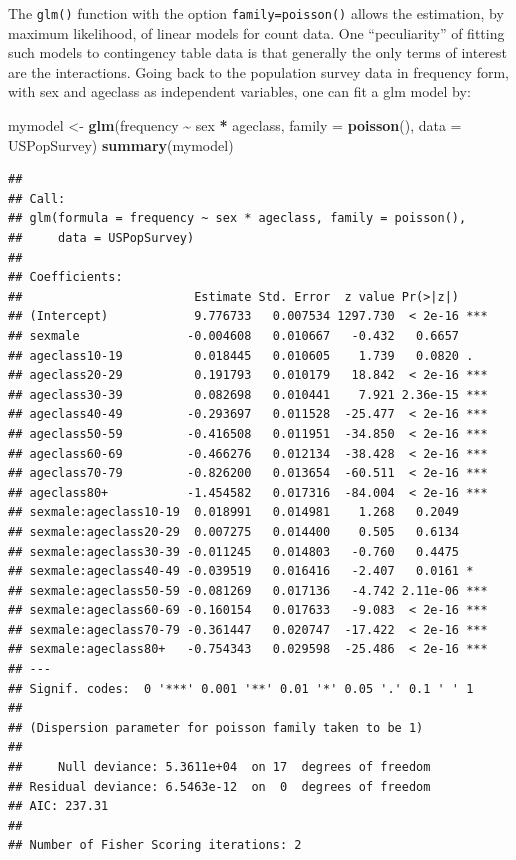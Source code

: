\documentclass[
  12pt,
]{book}
\newenvironment{Shaded}{\begin{snugshade}}{\end{snugshade}}
\newcommand{\DataTypeTok}[1]{\textcolor[rgb]{0.13,0.29,0.53}{#1}}
\newcommand{\KeywordTok}[1]{\textcolor[rgb]{0.13,0.29,0.53}{\textbf{#1}}}
\newcommand{\NormalTok}[1]{#1}
\newcommand{\OperatorTok}[1]{\textcolor[rgb]{0.81,0.36,0.00}{\textbf{#1}}}
\newcommand{\StringTok}[1]{\textcolor[rgb]{0.31,0.60,0.02}{#1}}
\begin{document}
The \texttt{glm()} function with the option \texttt{family=poisson()} allows the estimation, by maximum likelihood, of linear models for count data. One ``peculiarity'' of fitting such models to contingency table data is that generally the only terms of interest are the interactions. Going back to the population survey data in frequency form, with sex and ageclass as independent variables, one can fit a glm model by:

\begin{Shaded}
\begin{Highlighting}[]
\NormalTok{mymodel \textless{}{-}}\StringTok{ }\KeywordTok{glm}\NormalTok{(frequency }\OperatorTok{\textasciitilde{}}\StringTok{ }\NormalTok{sex }\OperatorTok{*}\StringTok{ }\NormalTok{ageclass, }\DataTypeTok{family =} \KeywordTok{poisson}\NormalTok{(), }\DataTypeTok{data =}\NormalTok{ USPopSurvey)}
\KeywordTok{summary}\NormalTok{(mymodel)}
\end{Highlighting}
\end{Shaded}

\begin{verbatim}
## 
## Call:
## glm(formula = frequency ~ sex * ageclass, family = poisson(), 
##     data = USPopSurvey)
## 
## Coefficients:
##                        Estimate Std. Error  z value Pr(>|z|)    
## (Intercept)            9.776733   0.007534 1297.730  < 2e-16 ***
## sexmale               -0.004608   0.010667   -0.432   0.6657    
## ageclass10-19          0.018445   0.010605    1.739   0.0820 .  
## ageclass20-29          0.191793   0.010179   18.842  < 2e-16 ***
## ageclass30-39          0.082698   0.010441    7.921 2.36e-15 ***
## ageclass40-49         -0.293697   0.011528  -25.477  < 2e-16 ***
## ageclass50-59         -0.416508   0.011951  -34.850  < 2e-16 ***
## ageclass60-69         -0.466276   0.012134  -38.428  < 2e-16 ***
## ageclass70-79         -0.826200   0.013654  -60.511  < 2e-16 ***
## ageclass80+           -1.454582   0.017316  -84.004  < 2e-16 ***
## sexmale:ageclass10-19  0.018991   0.014981    1.268   0.2049    
## sexmale:ageclass20-29  0.007275   0.014400    0.505   0.6134    
## sexmale:ageclass30-39 -0.011245   0.014803   -0.760   0.4475    
## sexmale:ageclass40-49 -0.039519   0.016416   -2.407   0.0161 *  
## sexmale:ageclass50-59 -0.081269   0.017136   -4.742 2.11e-06 ***
## sexmale:ageclass60-69 -0.160154   0.017633   -9.083  < 2e-16 ***
## sexmale:ageclass70-79 -0.361447   0.020747  -17.422  < 2e-16 ***
## sexmale:ageclass80+   -0.754343   0.029598  -25.486  < 2e-16 ***
## ---
## Signif. codes:  0 '***' 0.001 '**' 0.01 '*' 0.05 '.' 0.1 ' ' 1
## 
## (Dispersion parameter for poisson family taken to be 1)
## 
##     Null deviance: 5.3611e+04  on 17  degrees of freedom
## Residual deviance: 6.5463e-12  on  0  degrees of freedom
## AIC: 237.31
## 
## Number of Fisher Scoring iterations: 2
\end{verbatim}
\end{document}
